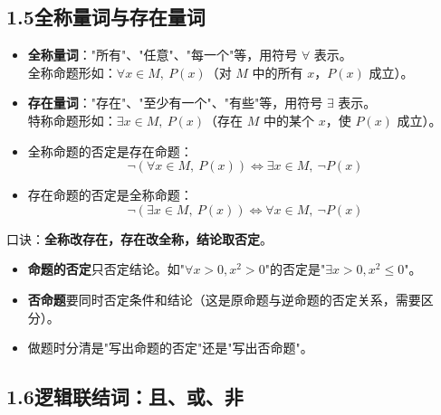 \documentclass[12pt, a4paper]{ctexart}
\begin{document}
\subsection*{1.5\quad 全称量词与存在量词}

\begin{knowledgebox}[全称量词与存在量词]
\begin{itemize}[leftmargin=2em]
  \item \textbf{全称量词}："所有"、"任意"、"每一个"等，用符号 $\forall$ 表示。\\
    全称命题形如：$\forall x \in M,\ P(x)$（对 $M$ 中的所有 $x$，$P(x)$ 成立）。
  \item \textbf{存在量词}："存在"、"至少有一个"、"有些"等，用符号 $\exists$ 表示。\\
    特称命题形如：$\exists x \in M,\ P(x)$（存在 $M$ 中的某个 $x$，使 $P(x)$ 成立）。
\end{itemize}
\end{knowledgebox}

\begin{knowledgebox}[命题的否定]
\begin{itemize}[leftmargin=2em]
  \item 全称命题的否定是存在命题：
    \[
      \neg(\forall x \in M,\ P(x)) \Leftrightarrow \exists x \in M,\ \neg P(x)
    \]
  \item 存在命题的否定是全称命题：
    \[
      \neg(\exists x \in M,\ P(x)) \Leftrightarrow \forall x \in M,\ \neg P(x)
    \]
\end{itemize}
口诀：\textbf{全称改存在，存在改全称，结论取否定}。
\end{knowledgebox}

\begin{warnbox}
\begin{itemize}[leftmargin=2em]
  \item \textbf{命题的否定}只否定结论。如"$\forall x > 0, x^2 > 0$"的否定是"$\exists x > 0, x^2 \leq 0$"。
  \item \textbf{否命题}要同时否定条件和结论（这是原命题与逆命题的否定关系，需要区分）。
  \item 做题时分清是"写出命题的否定"还是"写出否命题"。
\end{itemize}
\end{warnbox}

\subsection*{1.6\quad 逻辑联结词：且、或、非}
\end{document}
